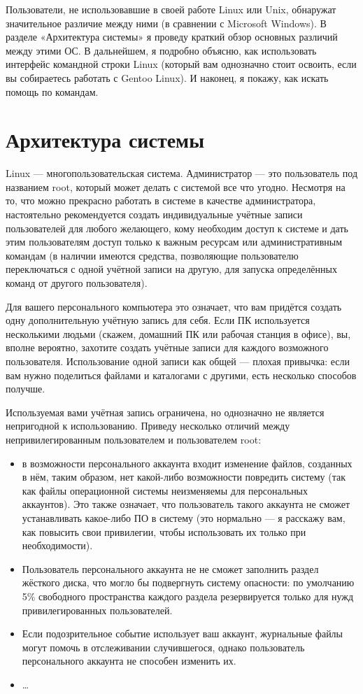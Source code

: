 \documentclass[10pt]{book}
\begin{document}
Пользователи, не использовавшие в своей работе Linux или Unix, обнаружат значительное различие между ними (в сравнении с Microsoft Windows). В разделе «Архитектура системы» я проведу краткий обзор основных различий между этими ОС. В дальнейшем, я подробно объясню, как использовать интерфейс командной строки Linux (который вам однозначно стоит освоить, если вы собираетесь работать с Gentoo Linux). И наконец, я покажу, как искать помощь по командам.

\section{Архитектура системы}

Linux --- многопользовательская система. Администратор --- это пользователь под названием root, который может делать с системой все что угодно. Несмотря на то, что можно прекрасно работать в системе в качестве администратора, настоятельно рекомендуется создать индивидуальные учётные записи пользователей для любого желающего, кому необходим доступ к системе и дать этим пользователям доступ только к важным ресурсам или административным командам (в наличии имеются средства, позволяющие пользователю переключаться с одной учётной записи на другую, для запуска определённых команд от другого пользователя). 

Для вашего персонального компьютера это означает, что вам придётся создать одну дополнительную учётную запись для себя. Если ПК используется несколькими людьми (скажем, домашний ПК или рабочая станция в офисе), вы, вполне вероятно, захотите создать учётные записи для каждого возможного пользователя. Использование одной записи как общей — плохая привычка: если вам нужно поделиться файлами и каталогами с другими, есть несколько способов получше.

Используемая вами учётная запись ограничена, но однозначно не является непригодной к использованию. Приведу несколько отличий между непривилегированным пользователем и пользователем root:

\begin{itemize}
	\item в возможности персонального аккаунта входит изменение файлов, созданных в нём, таким образом, нет какой-либо возможности повредить систему (так как файлы операционной системы неизменяемы для персональных аккаунтов). Это также означает, что пользователь такого аккаунта не сможет устанавливать какое-либо ПО в систему (это нормально — я расскажу вам, как повысить свои привилегии, чтобы использовать их только при необходимости).
	\item Пользователь персонального аккаунта не не сможет заполнить раздел жёсткого диска, что могло бы подвергнуть систему опасности: по умолчанию 5\% свободного пространства каждого раздела резервируется только для нужд привилегированных пользователей.
	\item Если подозрительное событие использует ваш аккаунт, журнальные файлы могут помочь в отслеживании случившегося, однако пользователь  персонального аккаунта не способен изменить их.
	\item \ldots
\end{itemize}
\end{document}

